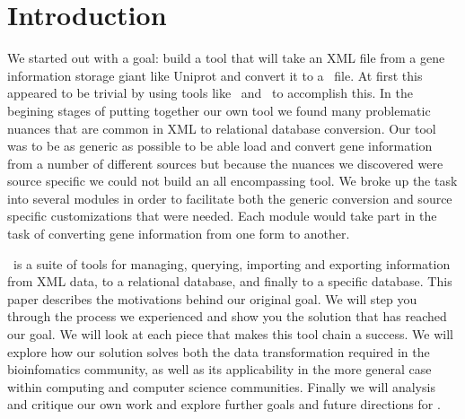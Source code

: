\section{Introduction}
We started out with a goal: build a tool that will take an XML file from a gene information storage giant like Uniprot and convert it to a \Genmapp~file. At first this appeared to be trivial by using tools like ~and \Hibernate~to accomplish this. In the begining stages of putting together our own tool we found many problematic nuances that are common in XML to relational database conversion. Our tool was to be as generic as possible to be able load and convert gene information from a number of different sources but because the nuances we discovered were source specific we could not build an all encompassing tool. We broke up the task into several modules in order to facilitate both the generic conversion and source specific customizations that were needed.  Each module would take part in the task of converting gene information from one form to another.

\xmlpipedb~is a suite of tools for managing, querying, importing and exporting information from XML data, to a relational database, and finally to a \Genmapp specific database. This paper describes the motivations behind our original goal.  We will step you through the process we experienced and show you the solution that has reached our goal. We will look at each piece that makes this tool chain a success.  We will explore how our solution solves both the data transformation required in the bioinfomatics community, as well as its applicability in the more general case within computing and computer science communities.  Finally we will analysis and critique our own work and explore further goals and future directions for \xmlpipedb.
